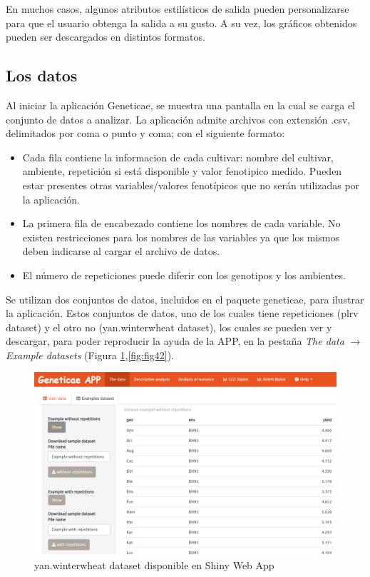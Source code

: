 En muchos casos, algunos atributos estilísticos de salida pueden personalizarse para que el usuario obtenga la salida a su gusto. A su vez, los gráficos obtenidos pueden ser descargados en distintos formatos.


\subsection{Los datos}
Al iniciar la aplicación Geneticae, se muestra una pantalla en la cual se carga el conjunto de datos a analizar. La aplicación admite archivos con extensión .csv, delimitados por coma o punto y coma; con el siguiente formato: 
\begin{itemize}[wide, nosep, labelindent = 0pt, topsep = 1ex]
\item Cada fila contiene la informacion de cada cultivar: nombre del cultivar, ambiente, repetición si está disponible y valor fenotipico medido. Pueden estar presentes otras variables/valores fenotípicos que no serán utilizadas por la aplicación.
\item La primera fila de encabezado contiene los nombres de cada variable. No existen restricciones para los nombres de las variables ya que los mismos deben indicarse al cargar el archivo de datos.
\item El número de repeticiones puede diferir con los genotipos y los ambientes.
\end{itemize}

Se utilizan dos conjuntos de datos, incluidos en el paquete geneticae, para ilustrar la aplicación. Estos conjuntos de datos, uno de los cuales tiene repeticiones (plrv dataset) y el otro no (yan.winterwheat dataset), los cuales se pueden ver y descargar, para poder reproducir la ayuda de la APP, en la pestaña \emph{The data} $\rightarrow$ \emph{Example datasets} (Figura \ref{fig:fig41},\ref{fig:fig42}). 

\begin{figure}[H]
	\begin{center}
		\includegraphics[width=16cm]{./Graficos/Exampledatasets_withoutrep.png}
	\end{center}
	\caption{yan.winterwheat dataset disponible en Shiny Web App}
	\label{fig:fig41}
\end{figure}


